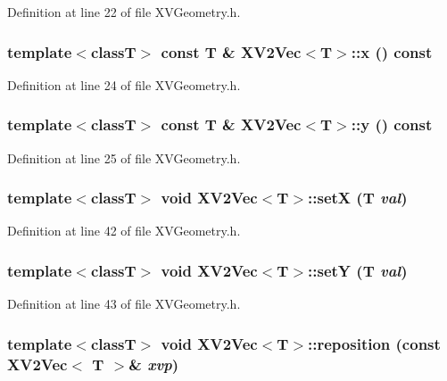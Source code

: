 Definition at line 22 of file XVGeometry.h.\label{XV2Vec_a2}
\hypertarget{class_XV2Vec_a2}{
\subsubsection[x]{\setlength{\rightskip}{0pt plus 5cm}template$<$classT$>$ const T \& XV2Vec$<$T$>$::x () const}}




Definition at line 24 of file XVGeometry.h.\label{XV2Vec_a3}
\hypertarget{class_XV2Vec_a3}{
\subsubsection[y]{\setlength{\rightskip}{0pt plus 5cm}template$<$classT$>$ const T \& XV2Vec$<$T$>$::y () const}}




Definition at line 25 of file XVGeometry.h.\label{XV2Vec_a7}
\hypertarget{class_XV2Vec_a7}{
\subsubsection[setX]{\setlength{\rightskip}{0pt plus 5cm}template$<$classT$>$ void XV2Vec$<$T$>$::set\-X (T {\em val})}}




Definition at line 42 of file XVGeometry.h.\label{XV2Vec_a8}
\hypertarget{class_XV2Vec_a8}{
\subsubsection[setY]{\setlength{\rightskip}{0pt plus 5cm}template$<$classT$>$ void XV2Vec$<$T$>$::set\-Y (T {\em val})}}




Definition at line 43 of file XVGeometry.h.\label{XV2Vec_a9}
\hypertarget{class_XV2Vec_a9}{
\subsubsection[reposition]{\setlength{\rightskip}{0pt plus 5cm}template$<$classT$>$ void XV2Vec$<$T$>$::reposition (const XV2Vec$<$ T $>$\& {\em xvp})}}




